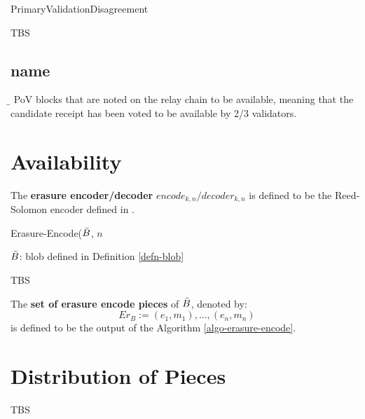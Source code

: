 \begin{algorithm}
  \caption[]{\sc PrimaryValidationDisagreement}
  \label{algo-primary-validation-disagreemnt}
  \begin{algorithmic}[1]
    \Require{}
    
    \State TBS
  \end{algorithmic}
\end{algorithm}
\subsection{name}
\label{sec:primary-validation-disagreemnt}


\begin{definition}
  \label{defn-pov-proposal}
        {\b }
        PoV blocks that are noted on the relay chain to be available, meaning that the candidate receipt has been voted to be available by 2/3 validators.
\end{definition}

\section{Availability}

\begin{definition}
  \label{defn-erasure-encoder-decoder}
  The {\bf erasure encoder/decoder} {\bf $encode_{k,n}/decoder_{k,n}$ } is defined to be the Reed-Solomon encoder defined in \cite{??}. 
\end{definition}

\begin{algorithm}
  \caption[]{\sc Erasure-Encode($\bar{B}$, $n$}
  \label{algo-erasure-encode}
  \begin{algorithmic}[1]
  \Require
    $\bar{B}$: blob defined in Definition \ref{defn-blob}
  
    \State TBS
  \end{algorithmic}
\end{algorithm}

\begin{definition}
  \label{defn-erasure-coded-pieces} 
  The {\bf set of erasure encode pieces} of $\bar{B}$, denoted by: 
  \[
   Er_B := {(e_1, m_1),...,(e_n,m_n)}
   \]
   is defined to be the output of the Algorithm \ref{algo-erasure-encode}.
\end{definition}

\section{Distribution of Pieces}\label{sect-distribute-piece}
TBS


